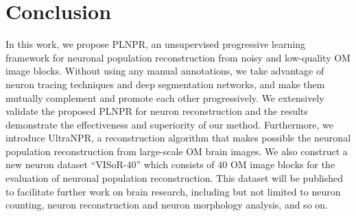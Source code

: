 \documentclass[times,twocolumn,final]{elsarticle}
\newcommand{\md}[1]{\textcolor[rgb]{0,0,1}{#1}}
\begin{document}

%
%
%

\section{Conclusion}
\label{sec:conclusion}
In this work, we propose PLNPR, an \md{unsupervised} progressive learning framework for neuronal population reconstruction from noisy and low-quality OM image blocks.
Without using any manual annotations, we take advantage of neuron tracing techniques and deep segmentation networks, and make them mutually complement and promote each other progressively.
We extensively validate the proposed PLNPR for neuron reconstruction and the results demonstrate the effectiveness and superiority of our method.
Furthermore, we introduce UltraNPR, a reconstruction algorithm that makes possible the neuronal population reconstruction from large-scale OM brain images.
We also construct a new neuron dataset ``VISoR-40'' which consists of $ 40 $ OM image blocks for the evaluation of neuronal population reconstruction.
This dataset will be published to facilitate further work on brain research, including but not limited to neuron counting, neuron reconstruction and neuron morphology analysis, and so on.


\end{document}

